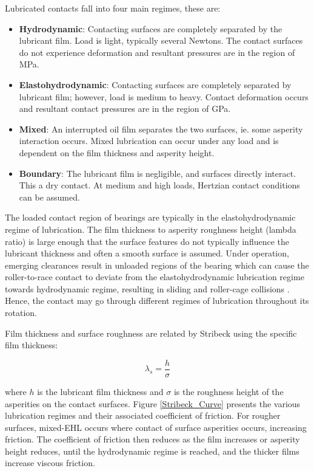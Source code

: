 Lubricated contacts fall into four main regimes, these are:

\begin{itemize}
	\item \textbf{Hydrodynamic}: Contacting surfaces are completely separated by the lubricant film. Load is light, typically several Newtons. The contact surfaces do not experience deformation and resultant pressures are in the region of MPa.
	\item \textbf{Elastohydrodynamic}: Contacting surfaces are completely separated by lubricant film; however, load is medium to heavy. Contact deformation occurs and resultant contact pressures are in the region of GPa.
	\item \textbf{Mixed}: An interrupted oil film separates the two surfaces, ie. some asperity interaction occurs. Mixed lubrication can occur under any load and is dependent on the film thickness and asperity height.
	\item \textbf{Boundary}: The lubricant film is negligible, and surfaces directly interact. This a dry contact. At medium and high loads, Hertzian contact conditions can be assumed.
\end{itemize}

The loaded contact region of bearings are typically in the elastohydrodynamic regime of lubrication. The film thickness to asperity roughness height (lambda ratio) is large enough that the surface features do not typically influence the lubricant thickness and often a smooth surface is assumed. Under operation, emerging clearances result in unloaded regions of the bearing which can cause the roller-to-race contact to deviate from the elastohydrodynamic lubrication regime towards hydrodynamic regime, resulting in sliding and roller-cage collisions \cite{Mohammadpour2015c}. Hence, the contact may go through different regimes of lubrication throughout its rotation.

Film thickness and surface roughness are related by Stribeck \cite{Stribeck1907} using the specific film thickness:

\begin{equation}\label{eq2.5}
	\lambda_s=\frac{h}{\sigma}
\end{equation}
 
 where $h$ is the lubricant film thickness and $\sigma$ is the roughness height of the asperities on the contact surfaces. Figure \ref{Stribeck_Curve} presents the various lubrication regimes and their associated coefficient of friction. For rougher surfaces, mixed-EHL occurs where contact of surface asperities occurs, increasing friction. The coefficient of friction then reduces as the film increases or asperity height reduces, until the hydrodynamic regime is reached, and the thicker films increase viscous friction.

